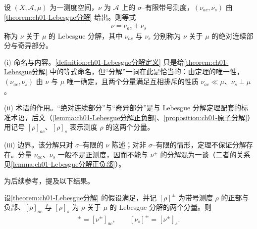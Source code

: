 \documentclass[../../main.tex]{subfiles}%
\begin{document}
\begin{definition}\label{definition:ch01-Lebesgue分解定义}\label{definition:ch01-Lebesgue分解}
设 $(X,\mathcal{A},\mu)$ 为一测度空间，$\nu$ 为 $\mathcal{A}$ 上的 $\sigma$--有限带号测度，$(\nu_{ac},\nu_s)$ 由\cref{theorem:ch01-Lebesgue分解} 给出。则等式
\begin{align*}
\nu=\nu_{ac}+\nu_s
\end{align*}
称为 $\nu$ 关于 $\mu$ 的 Lebesgue 分解，其中 $\nu_{ac}$ 与 $\nu_s$ 分别称为 $\nu$ 关于 $\mu$ 的绝对连续部分与奇异部分。
\end{definition}

\begin{remark}\label{remark:ch01-Lebesgue分解定义动机}
(i) 命名与内容。\cref{definition:ch01-Lebesgue分解定义} 只是给\cref{theorem:ch01-Lebesgue分解} 中的等式命名，但“分解”一词在此是恰当的：由定理的唯一性，$(\nu_{ac},\nu_s)$ 由 $\nu$ 与 $\mu$ 唯一确定，且两个分量满足互相排斥的性质 $\nu_{ac}\ll\mu$、$\nu_s\perp\mu$。

(ii) 术语的作用。“绝对连续部分”与“奇异部分”是与 Lebesgue 分解定理配套的标准术语，后文（\cref{lemma:ch01-Lebesgue分解正负部}、\cref{proposition:ch01-原子分解}）用记号 $[\rho]_{ac}$、$[\rho]_s$ 表示测度 $\rho$ 的这两个分量。

(iii) 边界。该分解只对 $\sigma$--有限的 $\nu$ 陈述；对非 $\sigma$--有限的情形，定理不保证分解存在。分量 $\nu_{ac}$、$\nu_s$ 一般不是正测度，因而不能与 $\nu^\pm$ 的分解混为一谈（二者的关系见\cref{lemma:ch01-Lebesgue分解正负部}）。
\end{remark}

为后续参考，提及以下结果。

\begin{lemma}\label{lemma:ch01-Lebesgue分解正负部}
设\cref{theorem:ch01-Lebesgue分解} 的假设满足，并记 $[\rho]^\pm$ 为带号测度 $\rho$ 的正部与负部、$[\rho]_{ac}$ 与 $[\rho]_s$ 为 $\rho$ 关于 $\mu$ 的 Lebesgue 分解的两个分量。则
\begin{align}
[\nu_{ac}]^\pm=[\nu^\pm]_{ac},\qquad [\nu_s]^\pm=[\nu^\pm]_s. \label{align:ch01-Lebesgue分解正负部}
\end{align}
\end{lemma}
\end{document}
